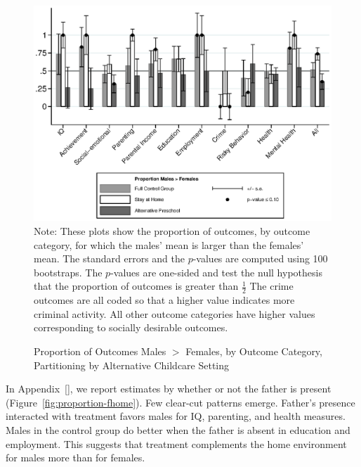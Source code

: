 \begin{figure}[H]
\centering
\caption{Proportion of Outcomes Males $>$ Females, by Outcome Category, Partitioning by Alternative Childcare Setting}
\label{fig:proportion-altpre}
	\includegraphics[width=\textwidth]{output/gendergaps-control-moderated-altpre}
\footnotesize \justify
Note: These plots show the proportion of outcomes, by outcome category, for which the males' mean is larger than the females' mean. The standard errors and the $p$-values are computed using 100 bootstraps. The $p$-values are one-sided and test the null hypothesis that the proportion of outcomes is greater than $\frac{1}{2}$ The crime outcomes are all coded so that a higher value indicates more criminal activity. All other outcome categories have higher values corresponding to socially desirable outcomes.
\end{figure}

In Appendix~\ref{}, we report estimates by whether or not the father is present (Figure~\ref{fig:proportion-fhome}). Few clear-cut patterns emerge. Father's presence interacted with treatment favors males for IQ, parenting, and health measures. Males in the control group do better when the father is absent in education and employment. This suggests that treatment complements the home environment for males more than for females.

